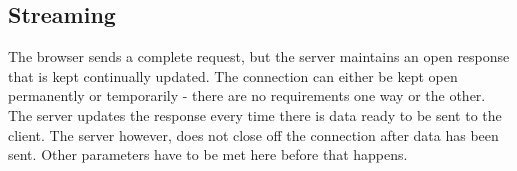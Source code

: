 \subsection{Streaming}


The browser sends a complete request, but the server maintains an open response that is kept continually updated\cite{lubbersgreco}. The connection can either be kept open permanently or temporarily - there are no requirements one way or the other\cite{lubbersgreco}. The server updates the response every time there is data ready to be sent to the client\cite{lubbersgreco}. The server however, does not close off the connection after data has been sent\cite{lubbersgreco}. Other parameters have to be met here before that happens\cite{lubbersgreco}.